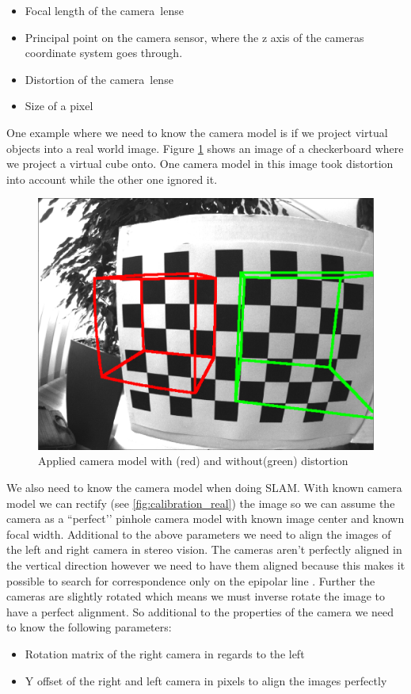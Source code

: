 \documentclass[11pt,a4paper,titlepage,oneside]{report}
\begin{document}
\begin{itemize}
	\item Focal length of the camera lense
	\item Principal point on the camera sensor, where the z axis of the cameras coordinate system goes through.
	\item Distortion of the camera lense
	\item Size of a pixel
\end{itemize}

One example where we need to know the camera model is if we project virtual objects into a real world image. Figure \ref{fig:model} shows an image of a checkerboard where we project a virtual cube onto. One camera model in this image took distortion into account while the other one ignored it.
\begin{figure}[H]
  \begin{center}
		\includegraphics[width=1.0\textwidth]{img/model.png}
  \end{center}
	\caption{Applied camera model with (red) and without(green) distortion}\label{fig:model}
\end{figure}

We also need to know the camera model when doing SLAM. With known camera model we can rectify (see \ref{fig:calibration_real}) the image so we can assume the camera as a ``perfect’’ pinhole camera model with known image center and known focal width. Additional to the above parameters we need to align the images of the left and right camera in stereo vision. The cameras aren’t perfectly aligned in the vertical direction however we need to have them aligned because this makes it possible to search for correspondence only on the epipolar line \cite{mvg}. Further the cameras are slightly rotated which means we must inverse rotate the image to have a perfect alignment. So additional to the properties of the camera we need to know the following parameters:
\begin{itemize}
	\item Rotation matrix of the right camera in regards to the left
	\item Y offset of the right and left camera in pixels to align the images perfectly
\end{itemize}
\end{document}
